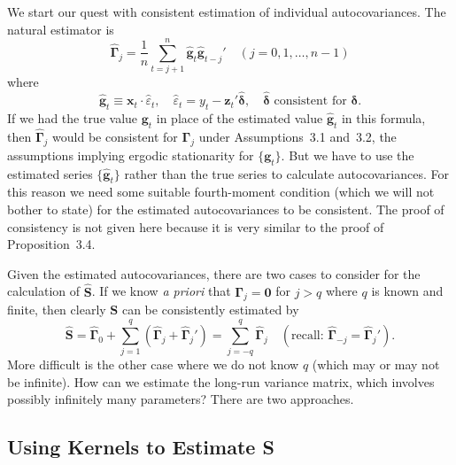 We start our quest with consistent estimation of individual autocovariances.
The natural estimator is
\begin{equation}
  \hat{\bm{\Gamma}}_j = \frac{1}{n} \sum_{t=j+1}^{n} \hat{\mathbf{g}}_t \hat{\mathbf{g}}_{t-j}'
  \quad (j = 0, 1, \ldots, n-1)
  \label{eq:6.6.3}
\end{equation}
where
\[
  \hat{\mathbf{g}}_t \equiv \mathbf{x}_t \cdot \hat{\varepsilon}_t, \quad
  \hat{\varepsilon}_t = y_t - \mathbf{z}_t' \hat{\bm{\delta}}, \quad
  \hat{\bm{\delta}} \text{ consistent for } \bm{\delta}.
\]
If we had the true value $\mathbf{g}_t$ in place of the estimated value $\hat{\mathbf{g}}_t$ in this formula, then
$\hat{\bm{\Gamma}}_j$ would be consistent for $\bm{\Gamma}_j$ under Assumptions~3.1 and~3.2, the assumptions
implying ergodic stationarity for $\{\mathbf{g}_t\}$. But we have to use the estimated series $\{\hat{\mathbf{g}}_t\}$
rather than the true series to calculate autocovariances. For this reason we need
some suitable fourth-moment condition (which we will not bother to state) for the
estimated autocovariances to be consistent. The proof of consistency is not given
here because it is very similar to the proof of Proposition~3.4.

Given the estimated autocovariances, there are two cases to consider for the
calculation of $\hat{\mathbf{S}}$. If we know \emph{a priori} that $\bm{\Gamma}_j = \mathbf{0}$ for $j > q$ where $q$ is known and
finite, then clearly $\mathbf{S}$ can be consistently estimated by
\begin{equation}
  \hat{\mathbf{S}} = \hat{\bm{\Gamma}}_0 + \sum_{j=1}^{q} (\hat{\bm{\Gamma}}_j + \hat{\bm{\Gamma}}_j')
  = \sum_{j=-q}^{q} \hat{\bm{\Gamma}}_j
  \quad (\text{recall: } \hat{\bm{\Gamma}}_{-j} = \hat{\bm{\Gamma}}_j').
  \label{eq:6.6.4}
\end{equation}
More difficult is the other case where we do not know $q$ (which may or may not
be infinite). How can we estimate the long-run variance matrix, which involves
possibly infinitely many parameters? There are two approaches.

\subsection*{Using Kernels to Estimate S}

